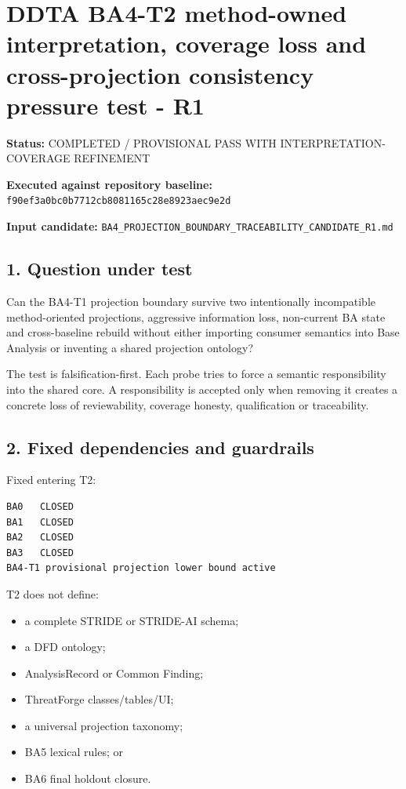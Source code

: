 \documentclass[11pt,a4paper]{article}
\providecommand{\tightlist}{\setlength{\itemsep}{0pt}\setlength{\parskip}{0pt}}
\begin{document}
\section{DDTA BA4-T2 method-owned interpretation, coverage loss and
cross-projection consistency pressure test -
R1}\label{ddta-ba4-t2-method-owned-interpretation-coverage-loss-and-cross-projection-consistency-pressure-test---r1}

\textbf{Status:} COMPLETED / PROVISIONAL PASS WITH
INTERPRETATION-COVERAGE REFINEMENT

\textbf{Executed against repository baseline:}
\texttt{f90ef3a0bc0b7712cb8081165c28e8923aec9e2d}

\textbf{Input candidate:}
\texttt{BA4\_PROJECTION\_BOUNDARY\_TRACEABILITY\_CANDIDATE\_R1.md}

\subsection{1. Question under test}\label{1-question-under-test}

Can the BA4-T1 projection boundary survive two intentionally
incompatible method-oriented projections, aggressive information loss,
non-current BA state and cross-baseline rebuild without either importing
consumer semantics into Base Analysis or inventing a shared projection
ontology?

The test is falsification-first. Each probe tries to force a semantic
responsibility into the shared core. A responsibility is accepted only
when removing it creates a concrete loss of reviewability, coverage
honesty, qualification or traceability.

\subsection{2. Fixed dependencies and
guardrails}\label{2-fixed-dependencies-and-guardrails}

Fixed entering T2:

\begin{verbatim}
BA0   CLOSED
BA1   CLOSED
BA2   CLOSED
BA3   CLOSED
BA4-T1 provisional projection lower bound active
\end{verbatim}

T2 does not define:

\begin{itemize}
\tightlist
\item
  a complete STRIDE or STRIDE-AI schema;
\item
  a DFD ontology;
\item
  AnalysisRecord or Common Finding;
\item
  ThreatForge classes/tables/UI;
\item
  a universal projection taxonomy;
\item
  BA5 lexical rules; or
\item
  BA6 final holdout closure.
\end{itemize}
\end{document}
